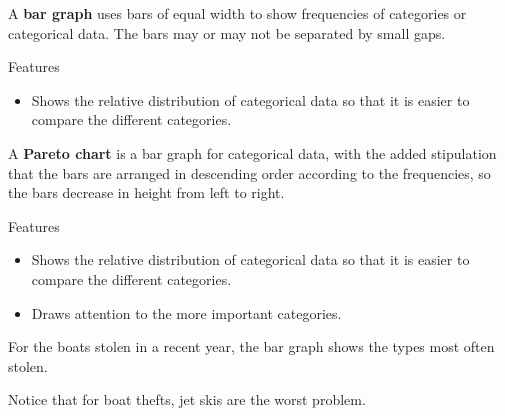 \documentclass{beamer}
\begin{document}
\begin{frame}
\begin{definition}
A \textbf{bar graph} uses bars of equal width to show frequencies of categories or categorical data. The bars may or may not be separated by small gaps.
\end{definition}\pause

\begin{block}{Features}
\begin{itemize}
\item Shows the relative distribution of categorical data so that it is easier to compare the different categories.
\end{itemize}
\end{block}\pause

\begin{definition}
A \textbf{Pareto chart} is a bar graph for categorical data, with the added stipulation that the bars are arranged in descending order according to the frequencies, so the bars decrease in height from left to right.
\end{definition}\pause

\begin{block}{Features}
\begin{itemize}
\item Shows the relative distribution of categorical data so that it is easier to compare the different categories.
\item Draws attention to the more important categories.
\end{itemize}
\end{block}
\end{frame}

\begin{frame}
\begin{example}
For the boats stolen in a recent year, the bar graph shows the types most often stolen.

\begin{center}

\end{center}\pause

Notice that for boat thefts, jet skis are the worst problem.
\end{example}
\end{frame}
\end{document}
